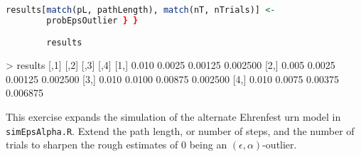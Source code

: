\documentclass[12pt]{article}
\begin{document}
\begin{solution}
\begin{lstlisting}[language=R]
        results[match(pL, pathLength), match(nT, nTrials)] <-
        probEpsOutlier } }

        results
    \end{lstlisting}

\begin{verbatim*}
> results
      [,1]   [,2]    [,3]     [,4]
[1,] 0.010 0.0025 0.00125 0.002500
[2,] 0.005 0.0025 0.00125 0.002500
[3,] 0.010 0.0100 0.00875 0.002500
[4,] 0.010 0.0075 0.00375 0.006875
\end{verbatim*}
\end{solution}

\begin{exercise}
    This exercise expands the simulation of the alternate Ehrenfest urn
    model in \texttt{simEpsAlpha.R}.  Extend the path length, or number
    of steps, and the number of trials to sharpen the rough estimates of
    \( 0 \) being an \( (\epsilon, \alpha) \)-outlier.
\end{exercise}
\end{document}
